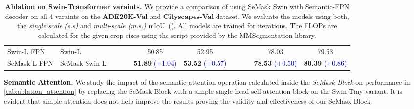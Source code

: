 \documentclass[10pt,twocolumn,letterpaper]{article}
\newcommand{\vspaceundertab}{\vspace{-.2cm}}
\begin{document}
\begin{table*}
{\begin{tabular}{ll|ccccc|ccccc}
    Swin-L FPN & Swin-L &  &  &  & 50.85 \phantom{(+0.00)} & 52.95 \phantom{(+0.00)} &  &  &  & 78.03 \phantom{(+0.00)} & 79.53 \phantom{(+0.00)} \\
    SeMask-L FPN & SeMask Swin-L &  &  &  & \textbf{51.89} \textcolor{blue}{(+1.04)} & \textbf{53.52} \textcolor{blue}{(+0.57)} &  &  &  & \textbf{78.53} \textcolor{blue}{(+0.50)} & \textbf{80.39} \textcolor{blue}{(+0.86)} \\
    \bottomrule
\end{tabular} }
  \vspaceundertab
  \caption{\textbf{Ablation on Swin-Transformer varaints.} We provide a comparison of using SeMask Swin with Semantic-FPN \cite{sem-fpn} decoder on all 4 varaints on the \textbf{ADE20K-Val} and \textbf{Cityscapes-Val} dataset. We evaluate the models using both, the \textit{single scale (s.s)} and \textit{multi-scale (m.s.)} mIoU~(). All models are trained for  iterations. The FLOPs are calculated for the given crop sizes using the script provided by the MMSegmentation \cite{mmseg} library.
      }
    \label{tab:ablation_model_size}
\end{table*}

\noindent
\textbf{Semantic Attention.} We study the impact of the semantic attention operation calculated inside the \textit{SeMask Block} on performance in \cref{tab:ablation_attention} by replacing the SeMask Block with a simple single-head self-attention block on the Swin-Tiny variant. It is evident that simple attention does not help improve the results proving the validity and effectiveness of our SeMask Block.

\begin{table}
  \centering
  \fontsize{10}{12}\selectfont
  \vspaceundertab
  \caption{\textbf{Ablation on Semantic Attention.} 
        We prove the effectiveness of the \textit{SeMask Block} by replacing it with a simple Single-Head Self Attention block which harms the performance on the \textit{Tiny} variant.}
    \label{tab:ablation_attention}
\end{table}
\end{document}
